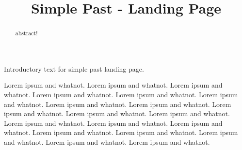 \documentclass{ximera}
\title{Simple Past - Landing Page}
\begin{document}
\begin{abstract}
abstract!
\end{abstract}
\maketitle

Introductory text for simple past landing page. 

Lorem ipsum and whatnot. Lorem ipsum and whatnot. Lorem ipsum and whatnot. Lorem ipsum and whatnot. Lorem ipsum and whatnot. Lorem ipsum and whatnot. Lorem ipsum and whatnot. Lorem ipsum and whatnot. Lorem ipsum and whatnot. Lorem ipsum and whatnot. Lorem ipsum and whatnot. Lorem ipsum and whatnot. Lorem ipsum and whatnot. Lorem ipsum and whatnot. Lorem ipsum and whatnot. Lorem ipsum and whatnot. Lorem ipsum and whatnot. Lorem ipsum and whatnot. Lorem ipsum and whatnot. 
\end{document}
